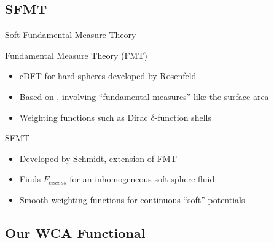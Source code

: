 \documentclass{beamer}
\begin{document}
\subsection*{SFMT}
\begin{frame}{Soft Fundamental Measure Theory}
  \begin{block}{Fundamental Measure Theory (FMT)} 
       \begin{itemize}
           \item cDFT for hard spheres developed by Rosenfeld
           \item Based on , involving
                 ``fundamental measures'' like the surface area
           \item Weighting functions such as Dirac $\delta$-function shells
       \end{itemize}
  \end{block} 
  \begin{block}{SFMT}
     \begin{itemize}            
           \item Developed by Schmidt, extension of FMT 
           \item Finds $F_{excess}$ for an inhomogeneous soft-sphere fluid
           \item Smooth weighting functions for
                continuous ``soft'' potentials
     \end{itemize}
  \end{block}  
\end{frame}

\subsection*{Our WCA Functional}
\end{document}
